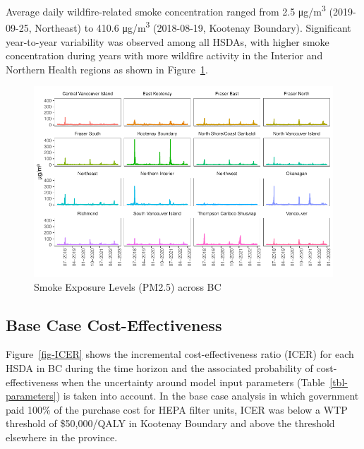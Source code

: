 \documentclass[
  number]{elsarticle}
\begin{document}
Average daily wildfire-related smoke concentration ranged from 2.5
μg/m\textsuperscript{3} (2019-09-25, Northeast) to 410.6
μg/m\textsuperscript{3} (2018-08-19, Kootenay Boundary). Significant
year-to-year variability was observed among all HSDAs, with higher smoke
concentration during years with more wildfire activity in the Interior
and Northern Health regions as shown in Figure~\ref{fig-smoke}.

\begin{figure}

{\centering \includegraphics{index_files/figure-pdf/fig-smoke-1.pdf}

}

\caption{\label{fig-smoke}Smoke Exposure Levels (PM2.5) across BC}

\end{figure}

\hypertarget{base-case-cost-effectiveness}{%
\subsection{Base Case
Cost-Effectiveness}\label{base-case-cost-effectiveness}}

Figure~\ref{fig-ICER} shows the incremental cost-effectiveness ratio
(ICER) for each HSDA in BC during the time horizon and the associated
probability of cost-effectiveness when the uncertainty around model
input parameters (Table~\ref{tbl-parameters}) is taken into account. In
the base case analysis in which government paid 100\% of the purchase
cost for HEPA filter units, ICER was below a WTP threshold of
\$50,000/QALY in Kootenay Boundary and above the threshold elsewhere in
the province.
\end{document}
